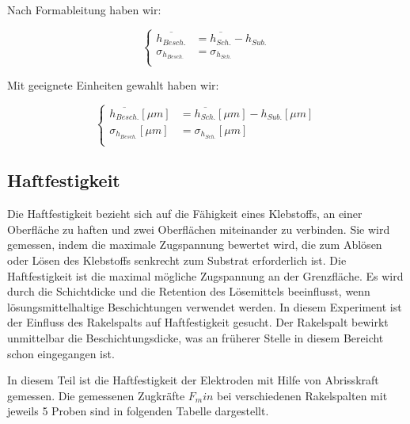 \documentclass[12pt,UTF8]{article}
\begin{document}
Nach Formableitung haben wir:
\begin{center}
    \begin{equation}
        \left\{
        \begin{aligned}
            \overline{h_{Besch.}} & =\overline{h_{Sch.}}-h_{Sub.} \\
            \sigma_{h_{Besch.}}   & =\sigma_{h_{Sch.}}            \\
        \end{aligned}
        \right.
    \end{equation}
\end{center}
Mit geeignete Einheiten gewahlt haben wir:
\begin{center}
    \begin{equation}
        \left\{
        \begin{aligned}
            \overline{h_{Besch.}}[\mu m] & =\overline{h_{Sch.}}[\mu m]-h_{Sub.}[\mu m] \\
            \sigma_{h_{Besch.}}[\mu m]   & =\sigma_{h_{Sch.}}[\mu m]                   \\
        \end{aligned}
        \right.
    \end{equation}
\end{center}

\subsection{Haftfestigkeit}
Die Haftfestigkeit bezieht sich auf die Fähigkeit eines Klebstoffs, an einer Oberfläche zu haften und zwei Oberflächen miteinander zu verbinden. Sie wird gemessen, indem die maximale Zugspannung bewertet wird, die zum Ablösen oder Lösen des Klebstoffs senkrecht zum Substrat erforderlich ist. Die Haftfestigkeit ist die maximal mögliche Zugspannung an der Grenzfläche. Es wird durch die Schichtdicke und die Retention des Lösemittels beeinflusst, wenn lösungsmittelhaltige Beschichtungen verwendet werden. In diesem Experiment ist der Einfluss des Rakelspalts auf Haftfestigkeit gesucht. Der Rakelspalt bewirkt unmittelbar die Beschichtungsdicke, was an früherer Stelle in diesem Bereicht schon eingegangen ist.

In diesem Teil ist die Haftfestigkeit der Elektroden mit Hilfe von Abrisskraft gemessen. Die gemessenen Zugkräfte $F_min$ bei verschiedenen Rakelspalten mit jeweils 5 Proben sind in folgenden Tabelle dargestellt.


\paragraph{}
\end{document}
